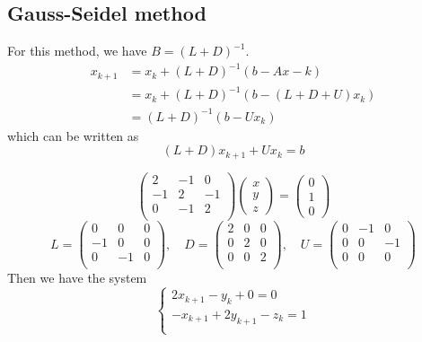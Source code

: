 \documentclass[11pt]{article}
\begin{document}
\subsection{Gauss-Seidel method}
For this method, we have $B = (L+D)^{-1}$.
\begin{align*}
    x_{k+1} &= x_k + (L+D)^{-1}(b-Ax-k)\\
    &= x_k + (L+D)^{-1}(b-(L+D+U)x_k)\\
    &= (L+D)^{-1}(b-Ux_k)
\end{align*}
which can be written as
\[
    (L+D)x_{k+1}+Ux_k = b
\]
\begin{example}
    \[
    \begin{pmatrix}
        2 & -1 & 0\\
        -1 & 2 & -1 \\
        0 & -1 & 2 \\
    \end{pmatrix}
    \begin{pmatrix}
        x\\
        y\\
        z
    \end{pmatrix}=
    \begin{pmatrix}
        0\\
        1\\
        0
    \end{pmatrix}
    \]
    \[
       L= \begin{pmatrix}
            0 & 0 & 0\\
            -1 & 0 & 0\\
            0 & -1 & 0 \\
        \end{pmatrix},\quad
        D = \begin{pmatrix}
            2 & 0 & 0\\
            0 & 2 & 0 \\
            0 & 0 & 2 \\
        \end{pmatrix}, \quad
        U = \begin{pmatrix}
            0 & -1 & 0\\
            0 & 0 & -1 \\
            0 & 0 & 0 \\
        \end{pmatrix}
    \]
    Then we have the system
    \[
        \begin{cases}
            2x_{k+1}-y_k+0 = 0 \\
            -x_{k+1}+2y_{k+1}-z_k = 1\\

\end{cases}\]
\end{example}
\end{document}
